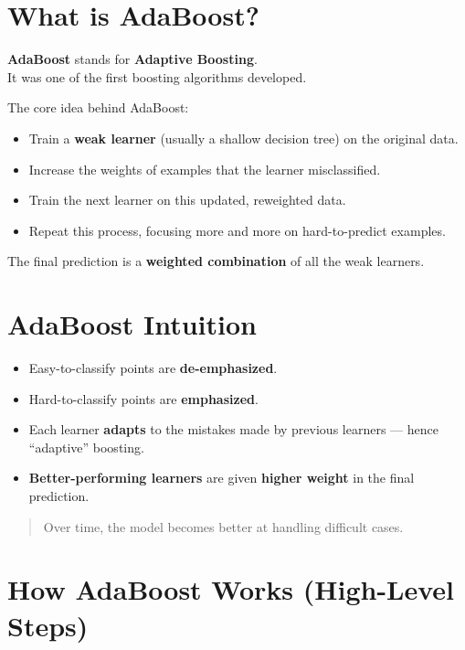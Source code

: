 \documentclass[
  letterpaper,
  DIV=11,
  numbers=noendperiod]{scrreprt}
\providecommand{\tightlist}{%
  \setlength{\itemsep}{0pt}\setlength{\parskip}{0pt}}\usepackage{longtable,booktabs,array}
\begin{document}
\section{What is AdaBoost?}\label{what-is-adaboost}

\textbf{AdaBoost} stands for \textbf{Adaptive Boosting}.\\
It was one of the first boosting algorithms developed.

The core idea behind AdaBoost:

\begin{itemize}
\tightlist
\item
  Train a \textbf{weak learner} (usually a shallow decision tree) on the
  original data.
\item
  Increase the weights of examples that the learner misclassified.
\item
  Train the next learner on this updated, reweighted data.
\item
  Repeat this process, focusing more and more on hard-to-predict
  examples.
\end{itemize}

The final prediction is a \textbf{weighted combination} of all the weak
learners.

\section{AdaBoost Intuition}\label{adaboost-intuition}

\begin{itemize}
\tightlist
\item
  Easy-to-classify points are \textbf{de-emphasized}.
\item
  Hard-to-classify points are \textbf{emphasized}.
\item
  Each learner \textbf{adapts} to the mistakes made by previous learners
  --- hence ``adaptive'' boosting.
\item
  \textbf{Better-performing learners} are given \textbf{higher weight}
  in the final prediction.
\end{itemize}

\begin{quote}
Over time, the model becomes better at handling difficult cases.
\end{quote}

\section{How AdaBoost Works (High-Level
Steps)}\label{how-adaboost-works-high-level-steps}
\end{document}
